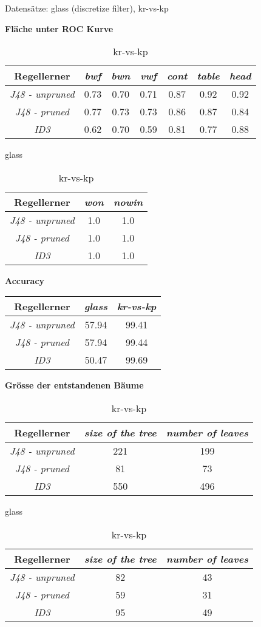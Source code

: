 
Datens\"atze: glass (discretize filter), kr-vs-kp

\textbf{Fl\"ache unter ROC Kurve}
\begin{table}[htb]
	\centering
\begin{tabular}{c|c|c|c|c|c|c}
				Regellerner       & \emph{bwf} & \emph{bwn} & \emph{vwf}  & \emph{cont} & \emph{table} & \emph{head} \\ \hline
				\emph{J48 - unpruned}& 0.73 & 0.70 & 0.71 & 0.87 & 0.92 & 0.92 \\ \hline
				\emph{J48 - pruned}  & 0.77 & 0.73 & 0.73 & 0.86 & 0.87 & 0.84 \\ \hline
				\emph{ID3}           & 0.62 & 0.70 & 0.59 & 0.81 & 0.77 & 0.88 
\end{tabular}
\caption{glass}

\begin{tabular}{c|c|c}
				Regellerner       & \emph{won} & \emph{nowin} \\ \hline
				\emph{J48 - unpruned} & 1.0 & 1.0  \\ \hline
				\emph{J48 - pruned}  & 1.0 & 1.0  \\ \hline
				\emph{ID3}  & 1.0 & 1.0 
\end{tabular}
\caption{kr-vs-kp}
\end{table}

\textbf{Accuracy}
\begin{table}[htb]
	\centering
\begin{tabular}{c|c|c}
				Regellerner       & \emph{glass} & \emph{kr-vs-kp}  \\ \hline
				\emph{J48 - unpruned}  & 57.94 & 99.41 \\ \hline
				\emph{J48 - pruned} & 57.94  & 99.44 \\ \hline
				\emph{ID3}  & 50.47 & 99.69
\end{tabular}
\end{table}

\textbf{Gr\"osse der entstandenen B\"aume}

\begin{table}[htb]
	\centering
\begin{tabular}{c|c|c}
	Regellerner       & \emph{size of the tree} & \emph{number of leaves}  \\ \hline
	\emph{J48 - unpruned} & 221  & 199  \\ \hline
	\emph{J48 - pruned}   & 81   & 73   \\ \hline
	\emph{ID3}            & 550  & 496  
\end{tabular}
\caption{glass}

\begin{tabular}{c|c|c}
	Regellerner       & \emph{size of the tree} & \emph{number of leaves}  \\ \hline
	\emph{J48 - unpruned}  & 82 & 43 \\ \hline
	\emph{J48 - pruned} & 59  & 31 \\ \hline
	\emph{ID3}  & 95 & 49
\end{tabular}
\caption{kr-vs-kp}
\end{table}


